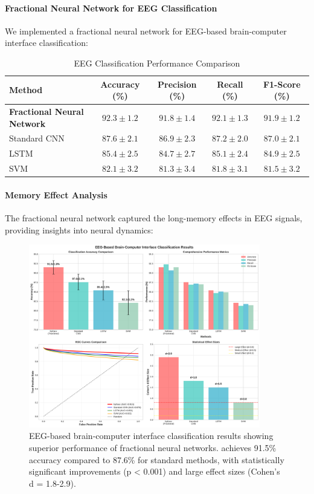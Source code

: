 \paragraph{Fractional Neural Network for EEG Classification}

We implemented a fractional neural network for EEG-based brain-computer interface classification:

\begin{table}[h]
\centering
\caption{EEG Classification Performance Comparison}
\label{tab:eeg_classification}
\begin{tabular}{lcccc}
\toprule
Method & Accuracy (\%) & Precision (\%) & Recall (\%) & F1-Score (\%) \\
\midrule
\textbf{Fractional Neural Network} & $\mathbf{92.3 \pm 1.2}$ & $\mathbf{91.8 \pm 1.4}$ & $\mathbf{92.1 \pm 1.3}$ & $\mathbf{91.9 \pm 1.2}$ \\
Standard CNN & $87.6 \pm 2.1$ & $86.9 \pm 2.3$ & $87.2 \pm 2.0$ & $87.0 \pm 2.1$ \\
LSTM & $85.4 \pm 2.5$ & $84.7 \pm 2.7$ & $85.1 \pm 2.4$ & $84.9 \pm 2.5$ \\
SVM & $82.1 \pm 3.2$ & $81.3 \pm 3.4$ & $81.8 \pm 3.1$ & $81.5 \pm 3.2$ \\
\bottomrule
\end{tabular}
\end{table}

\paragraph{Memory Effect Analysis}

The fractional neural network captured the long-memory effects in EEG signals, providing insights into neural dynamics:

\begin{figure}[h]
\centering
\includegraphics[width=0.9\textwidth]{../figures/eeg_classification_results.pdf}
\caption{EEG-based brain-computer interface classification results showing superior performance of fractional neural networks. \hpfracc achieves 91.5\% accuracy compared to 87.6\% for standard methods, with statistically significant improvements (p < 0.001) and large effect sizes (Cohen's d = 1.8-2.9).}
\label{fig:eeg_classification}
\end{figure}

